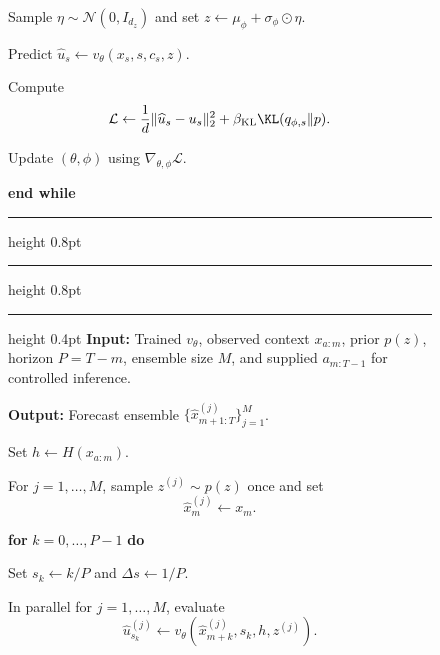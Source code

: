 \begin{figure}[t]
\begin{minipage}[t]{0.485\linewidth}
\begin{vsfalgorithmsteps}
      \item[] Sample $\eta\sim\mathcal N(0,I_{d_z})$ and set
      $z\leftarrow\mu_\phi+\sigma_\phi\odot\eta$.

      \item[] Predict
      $\widehat u_s\leftarrow v_\theta(x_s,s,c_s,z)$.

      \item[] Compute
      \[
        \mathcal L\leftarrow
        \frac{1}{d}\|\widehat u_s-u_s\|_2^2
        +\beta_{\mathrm{KL}}\KL(q_{\phi,s}\|p).
      \]

      \item[] Update $(\theta,\phi)$ using $\nabla_{\theta,\phi}\mathcal L$.
    \end{vsfalgorithmsteps}
    \noindent\textbf{end while}
    \vspace{0.3em}\hrule height 0.8pt
  \end{minipage}
  \hfill
  \begin{minipage}[t]{0.485\linewidth}
    \vspace{0pt}
    \footnotesize
    \hrule height 0.8pt
    \vspace{0.25em}
    \vspace{0.15em}\hrule height 0.4pt\vspace{0.3em}
    \noindent\textbf{Input:} Trained $v_\theta$, observed context
    $x_{a:m}$, prior $p(z)$, horizon $P=T-m$, ensemble size $M$, and supplied
    $a_{m:T-1}$ for controlled inference.

    \noindent\textbf{Output:} Forecast ensemble
    $\{\widehat x_{m+1:T}^{(j)}\}_{j=1}^{M}$.

    \begin{vsfalgorithmsteps}
      \item[] Set $h\leftarrow H(x_{a:m})$.

      \item[] For $j=1,\ldots,M$, sample $z^{(j)}\sim p(z)$ once and set
      \[
        \widehat x_m^{(j)}\leftarrow x_m.
      \]

      \item[] \textbf{for} $k=0,\ldots,P-1$ \textbf{do}
      \begin{vsfalgorithmsteps}
        \item[] Set $s_k\leftarrow k/P$ and $\Delta s\leftarrow1/P$.

        \item[] In parallel for $j=1,\ldots,M$, evaluate
        \[
          \widehat u_{s_k}^{(j)}\leftarrow
          v_\theta\!\left(
            \widehat x_{m+k}^{(j)},s_k,
            h,z^{(j)}
          \right).
        \]


\end{vsfalgorithmsteps}
\end{vsfalgorithmsteps}
\end{minipage}
\end{figure}
